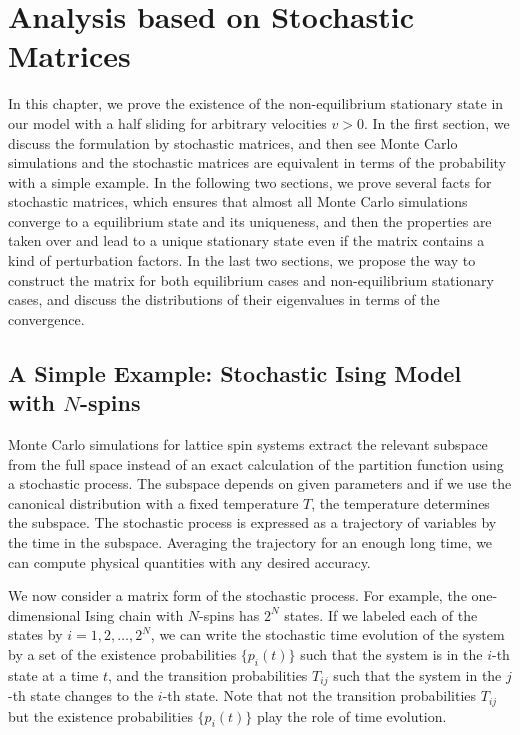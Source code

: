 
\chapter{Analysis based on Stochastic Matrices}
\label{chap:ProofEx}

In this chapter, we prove the existence of the non-equilibrium stationary state in our model with a half sliding for arbitrary velocities $v>0$. In the first section, we discuss the formulation by stochastic matrices, and then see Monte Carlo simulations and the stochastic matrices are equivalent in terms of the probability with a simple example. In the following two sections, we prove several facts for stochastic matrices, which ensures that almost all Monte Carlo simulations converge to a equilibrium state and its uniqueness, and then the properties are taken over and lead to a unique stationary state even if the matrix contains a kind of perturbation factors. In the last two sections, we propose the way to construct the matrix for both equilibrium cases and non-equilibrium stationary cases, and discuss the distributions of their eigenvalues in terms of the convergence.

\section{A Simple Example: Stochastic Ising Model with $N$-spins}
Monte Carlo simulations for lattice spin systems extract the relevant subspace from the full space instead of an exact calculation of the partition function using a stochastic process. The subspace depends on given parameters and if we use the canonical distribution with a fixed temperature $T$, the temperature determines the subspace. The stochastic process is expressed as a trajectory of variables by the time in the subspace. Averaging the trajectory for an enough long time, we can compute physical quantities with any desired accuracy.

We now consider a matrix form of the stochastic process. For example, the one-dimensional Ising chain with $N$-spins has $2^{N}$ states. If we labeled each of the states by $i=1,2,\dots,2^{N}$, we can write the stochastic time evolution of the system by a set of the existence probabilities $\{p_{i}(t)\}$ such that the system is in the $i$-th state at a time $t$, and the transition probabilities $T_{ij}$ such that the system in the $j$-th state changes to the $i$-th state. Note that not the transition probabilities $T_{ij}$ but the existence probabilities $\{p_{i}(t)\}$ play the role of time evolution.

